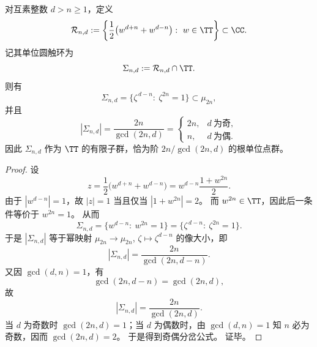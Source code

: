\begin{proposition}[玫瑰轨道的单位圆触环与奇偶分岔]\label{prop:xi-rose-unit-circle-touch-ring-parity-bifurcation}
对互素整数 \(d>n\ge 1\)，定义
\[
\mathcal R_{n,d}
:=
\left\{
\frac12\bigl(w^{d+n}+w^{d-n}\bigr):\ w\in\TT
\right\}\subset\CC.
\]
记其单位圆触环为
\[
\Sigma_{n,d}:=\mathcal R_{n,d}\cap\TT.
\]
则有
\[
\boxed{\;
\Sigma_{n,d}
=
\{\zeta^{\,d-n}:\ \zeta^{2n}=1\}\subset\mu_{2n},\;}
\]
并且
\[
\boxed{\;
|\Sigma_{n,d}|
=
\frac{2n}{\gcd(2n,d)}
=
\begin{cases}
2n,& d\ \text{为奇},\\[2pt]
n,& d\ \text{为偶}.
\end{cases}\;}
\]
因此 \(\Sigma_{n,d}\) 作为 \(\TT\) 的有限子群，恰为阶 \(2n/\gcd(2n,d)\) 的根单位点群。
\end{proposition}
\begin{proof}
设
\[
z=\frac12\bigl(w^{d+n}+w^{d-n}\bigr)
=
w^{d-n}\frac{1+w^{2n}}{2}.
\]
由于 \(|w^{d-n}|=1\)，故 \(|z|=1\) 当且仅当 \(|1+w^{2n}|=2\)。
而 \(w^{2n}\in\TT\)，因此后一条件等价于 \(w^{2n}=1\)。
从而
\[
\Sigma_{n,d}
=
\{w^{d-n}:\ w^{2n}=1\}
=
\{\zeta^{\,d-n}:\ \zeta^{2n}=1\}.
\]
于是 \(|\Sigma_{n,d}|\) 等于幂映射
\(\mu_{2n}\to\mu_{2n}\), \(\zeta\mapsto \zeta^{d-n}\)
的像大小，即
\[
|\Sigma_{n,d}|=\frac{2n}{\gcd(2n,d-n)}.
\]
又因 \(\gcd(d,n)=1\)，有
\[
\gcd(2n,d-n)=\gcd(2n,d),
\]
故
\[
|\Sigma_{n,d}|=\frac{2n}{\gcd(2n,d)}.
\]
当 \(d\) 为奇数时 \(\gcd(2n,d)=1\)；当 \(d\) 为偶数时，由 \(\gcd(d,n)=1\) 知 \(n\) 必为奇数，因而 \(\gcd(2n,d)=2\)。
于是得到奇偶分岔公式。
证毕。
\end{proof}

